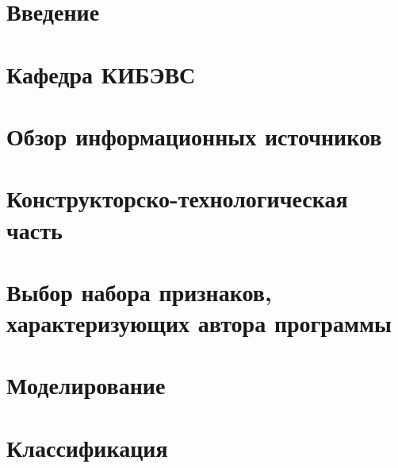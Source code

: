 
 

\newpage
%  
 
 \newpage
 
 
 
 
 \newpage
{}
 \tableofcontents

\newpage
\setcounter{section}{0}
\section*{Введение}


\newpage
\section{Кафедра КИБЭВС}



\newpage 
\section{Обзор информационных источников }



\newpage
\section{Конструкторско-технологическая часть}




\newpage 
\section{Выбор набора признаков, характеризующих автора программы}\label{features}
 
 
\newpage  
\section{Моделирование}\label{modeling}

 
% 
 
\newpage  
\section{Классификация}\label{classifiers}












